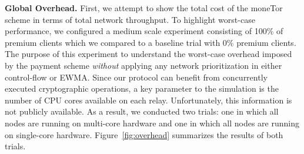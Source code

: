 \medskip
\noindent
\textbf{Global Overhead.}
First, we attempt to show the total cost of the moneTor scheme in terms of total
network throughput. To highlight worst-case performance, we configured a medium
scale experiment consisting of 100\% of premium clients which we compared to a
baseline trial with 0\% premium clients. The purpose of this experiment to
understand the worst-case overhead imposed by the payment scheme \emph{without}
applying any network prioritization in either control-flow or EWMA. Since our
protocol can benefit from concurrently executed cryptographic operations, a key
parameter to the simulation is the number of CPU cores available on each relay.
Unfortunately, this information is not publicly available. As a result, we
conducted two trials: one in which all nodes are running on multi-core hardware
and one in which all nodes are running on single-core hardware.
Figure~\ref{fig:overhead} summarizes the results of both trials.


